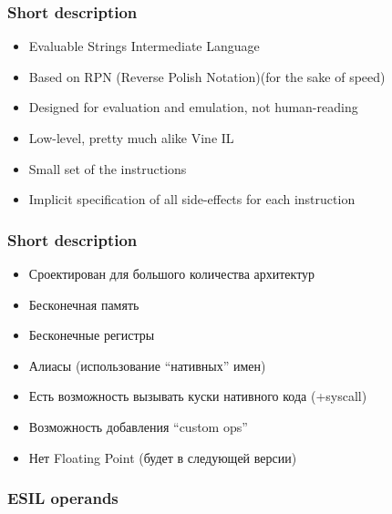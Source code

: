 \documentclass[10pt,pdf,utf8,english,compress,hyperref={unicode}]{beamer}
\begin{document}
\begin{frame}[fragile]
  \frametitle{Short description}
     \begin{itemize}
        \item Evaluable Strings Intermediate Language 
		\item Based on RPN (Reverse Polish Notation)(for the sake of speed)
		\item Designed for evaluation and emulation, not human-reading
		\item Low-level, pretty much alike Vine IL
		\item Small set of the instructions
		\item Implicit specification of all side-effects for each instruction
      \end{itemize}
\end{frame}

\begin{frame}[fragile]
  \frametitle{Short description}
     \begin{itemize}
        \item Сроектирован для большого количества архитектур
		\item Бесконечная память
		\item Бесконечные регистры
		\item Алиасы (использование ``нативных'' имен)
		\item Есть возможность вызывать куски нативного кода (+syscall)
		\item Возможность добавления ``custom ops''
		\item Нет Floating Point (будет в следующей версии)
      \end{itemize}
\end{frame}

\begin{frame}[fragile]
  \frametitle{ESIL operands}
    \begin{table}[H]
	\caption{ESIL Operands }
	\begin{center}
	\end{center}
	\end{table}
\end{frame}
\end{document}

